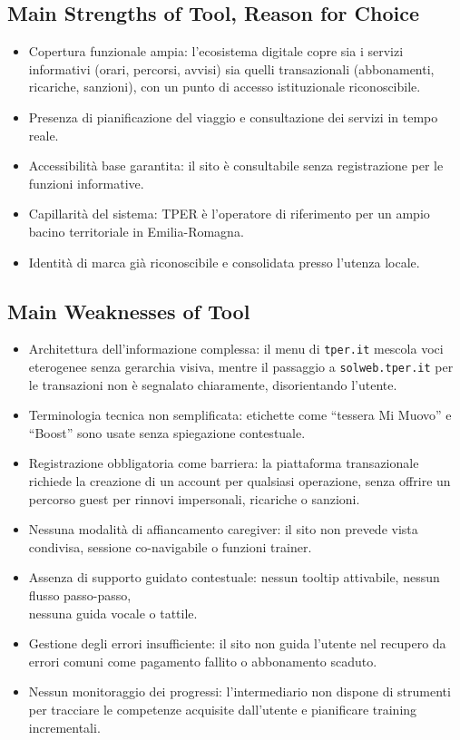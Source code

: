 ﻿\documentclass[11pt,a4paper]{article}
\begin{document}
\subsection*{Main Strengths of Tool, Reason for Choice}

\begin{itemize}
    \item Copertura funzionale ampia: l'ecosistema digitale copre sia
    i servizi informativi (orari, percorsi, avvisi) sia quelli
    transazionali (abbonamenti, ricariche, sanzioni), con un punto
    di accesso istituzionale riconoscibile.
    \item Presenza di pianificazione del viaggio e consultazione dei servizi in tempo reale.
    \item Accessibilità base garantita: il sito è consultabile senza registrazione per le funzioni informative.
    \item Capillarità del sistema: TPER è l'operatore di riferimento per un ampio bacino territoriale in Emilia-Romagna.
    \item Identità di marca già riconoscibile e consolidata presso l’utenza locale.
\end{itemize}

\subsection*{Main Weaknesses of Tool}

\begin{itemize}
    \item Architettura dell'informazione complessa: il menu di
    \texttt{tper.it} mescola voci eterogenee senza gerarchia visiva,
    mentre il passaggio a \texttt{solweb.tper.it} per le transazioni
    non è segnalato chiaramente, disorientando l'utente.
    \item Terminologia tecnica non semplificata: etichette come
    ``tessera Mi Muovo'' e ``Boost'' sono usate senza spiegazione
    contestuale.
    \item Registrazione obbligatoria come barriera: la piattaforma
    transazionale richiede la creazione di un account per qualsiasi
    operazione, senza offrire un percorso guest per rinnovi
    impersonali, ricariche o sanzioni.
    \item Nessuna modalità di affianca\-mento caregiver: il sito non prevede vista condivisa, sessione co-navigabile o funzioni trainer.
    \item Assenza di supporto guidato contestuale: nessun tooltip attivabile, nessun flusso passo-passo,\\ nessuna guida vocale o tattile.
    \item Gestione degli errori insufficiente: il sito non guida l'utente nel recupero da errori comuni come pagamento fallito o abbonamento scaduto.
    \item Nessun monitoraggio dei progressi: l'intermediario non dispone di strumenti per tracciare le competenze acquisite dall'utente e pianificare training incrementali.
\end{itemize}
\end{document}
